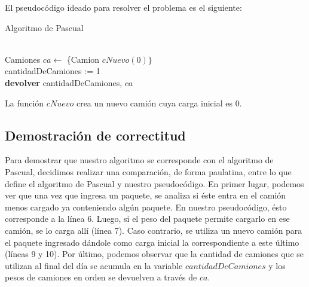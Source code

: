 El pseudocódigo ideado para resolver el problema es el siguiente:\newline

\begin{algorithm}[H]
	\SetAlgoLined
	\caption{Algoritmo de Pascual}
	\\
	
	Camiones $ca \leftarrow$ \{Camion $cNuevo(0)\}$\\
	cantidadDeCamiones := 1\\
	\textbf{devolver} cantidadDeCamiones, $ca$
\end{algorithm}

La función $cNuevo$ crea un nuevo camión cuya carga inicial es 0.
\subsection{Demostración de correctitud}

Para demostrar que nuestro algoritmo se corresponde con el algoritmo de Pascual, decidimos realizar una comparación, de forma paulatina, entre lo que define el algoritmo de Pascual y nuestro pseudocódigo.\newline
\newline
En primer lugar, podemos ver que una vez que ingresa un paquete, se analiza si éste entra en el camión menos cargado ya conteniendo algún paquete. En nuestro pseudocódigo, ésto corresponde a la línea 6.\newline
\newline
Luego, si el peso del paquete permite cargarlo en ese camión, se lo carga allí (línea 7). Caso contrario, se utiliza un nuevo camión para el paquete ingresado dándole como carga inicial la correspondiente a este último (líneas 9 y 10).\newline
\newline
Por último, podemos observar que la cantidad de camiones que se utilizan al final del día se acumula en la variable $cantidadDeCamiones$ y los pesos de camiones en orden se devuelven a través de $ca$.

